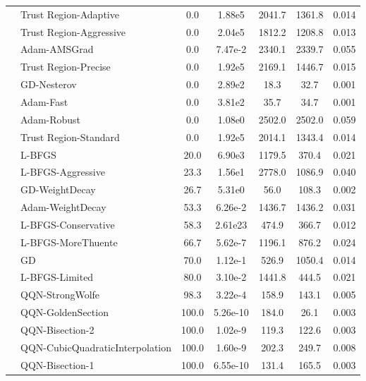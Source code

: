 \documentclass{article}
\begin{document}
\begin{table}[htbp]
{\begin{tabular}{p{2.5cm}p{2.5cm}*{5}{c}}
 & Trust Region-Adaptive & 0.0 & 1.88e5 & 2041.7 & 1361.8 & 0.014 \\
 & Trust Region-Aggressive & 0.0 & 2.04e5 & 1812.2 & 1208.8 & 0.013 \\
 & Adam-AMSGrad & 0.0 & 7.47e-2 & 2340.1 & 2339.7 & 0.055 \\
 & Trust Region-Precise & 0.0 & 1.92e5 & 2169.1 & 1446.7 & 0.015 \\
 & GD-Nesterov & 0.0 & 2.89e2 & 18.3 & 32.7 & 0.001 \\
 & Adam-Fast & 0.0 & 3.81e2 & 35.7 & 34.7 & 0.001 \\
 & Adam-Robust & 0.0 & 1.08e0 & 2502.0 & 2502.0 & 0.059 \\
 & Trust Region-Standard & 0.0 & 1.92e5 & 2014.1 & 1343.4 & 0.014 \\
 & L-BFGS & 20.0 & 6.90e3 & 1179.5 & 370.4 & 0.021 \\
 & L-BFGS-Aggressive & 23.3 & 1.56e1 & 2778.0 & 1086.9 & 0.040 \\
 & GD-WeightDecay & 26.7 & 5.31e0 & 56.0 & 108.3 & 0.002 \\
 & Adam-WeightDecay & 53.3 & 6.26e-2 & 1436.7 & 1436.2 & 0.031 \\
 & L-BFGS-Conservative & 58.3 & 2.61e23 & 474.9 & 366.7 & 0.012 \\
 & L-BFGS-MoreThuente & 66.7 & 5.62e-7 & 1196.1 & 876.2 & 0.024 \\
 & GD & 70.0 & 1.12e-1 & 526.9 & 1050.4 & 0.014 \\
 & L-BFGS-Limited & 80.0 & 3.10e-2 & 1441.8 & 444.5 & 0.021 \\
 & QQN-StrongWolfe & 98.3 & 3.22e-4 & 158.9 & 143.1 & 0.005 \\
 & QQN-GoldenSection & 100.0 & 5.26e-10 & 184.0 & 26.1 & 0.003 \\
 & QQN-Bisection-2 & 100.0 & 1.02e-9 & 119.3 & 122.6 & 0.003 \\
 & QQN-CubicQuadraticInterpolation & 100.0 & 1.60e-9 & 202.3 & 249.7 & 0.008 \\
 & QQN-Bisection-1 & 100.0 & 6.55e-10 & 131.4 & 165.5 & 0.003 \\
\midrule
\bottomrule
\end{tabular}
}
\end{table}
\end{document}
